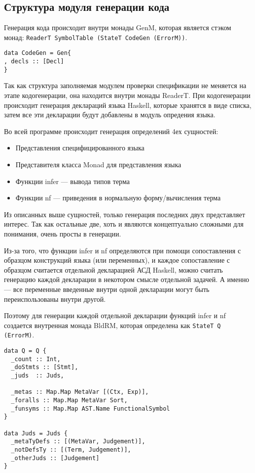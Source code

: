 \subsection{Структура модуля генерации кода}\label{repr}
Генерация кода происходит внутри монады GenM, которая является стэком монад: \lstinline{ReaderT SymbolTable (StateT CodeGen (ErrorM))}.

\begin{lstlisting}[caption={Структура используемая при кодогенерации},captionpos=b,frame=single]
data CodeGen = Gen{
, decls :: [Decl]
}
\end{lstlisting}

Так как структура заполняемая модулем проверки спецификации не меняется на этапе кодогенерации, она находится внутри монады ReaderT. При кодогенерации происходит генерация деклараций языка Haskell, которые хранятся в виде списка, затем все эти декларации будут добавлены в модуль опредения языка.

Во всей программе происходит генерация определений 4ех сущностей:
\begin{itemize}
\item Представления специфицированного языка
\item Представителя класса Monad для представления языка
\item Функции infer --- вывода типов терма
\item Функции nf --- приведения в нормальную форму/вычисления терма
\end{itemize}

Из описанных выше сущностей, только генерация последних двух представляет интерес. Так как остальные две, хоть и являются концептуально сложными для понимания, очень просты в генерации.

Из-за того, что функции infer и nf определяются при помощи сопоставления с образцом конструкций языка (или переменных), и каждое сопоставление с образцом считается отдельной декларацией АСД Haskell, можно считать генерацию каждой декларации в некотором смысле отдельной задачей. А именно --- все переменные введенные внутри одной декларации могут быть переиспользованы внутри другой.

Поэтому для генерации каждой отдельной декларации функций infer и nf создается внутренная монада BldRM, которая определена как \lstinline{StateT Q (ErrorM)}.

\begin{lstlisting}[caption={Структура используемая при кодогенерации функций infer и nf},captionpos=b,frame=single]
data Q = Q {
  _count :: Int,
  _doStmts :: [Stmt],
  _juds  :: Juds,

  _metas :: Map.Map MetaVar [(Ctx, Exp)],
  _foralls :: Map.Map MetaVar Sort,
  _funsyms :: Map.Map AST.Name FunctionalSymbol
}

data Juds = Juds {
  _metaTyDefs :: [(MetaVar, Judgement)],
  _notDefsTy :: [(Term, Judgement)],
  _otherJuds :: [Judgement]
}
\end{lstlisting}

